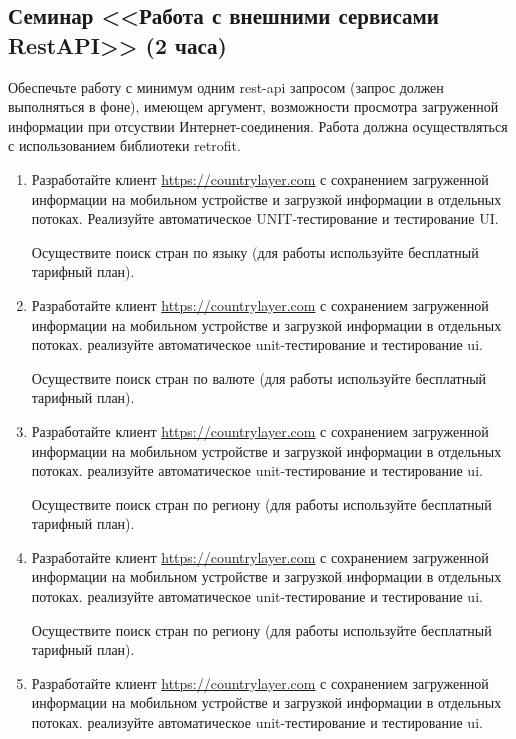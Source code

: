 \subsection{Семинар <<Работа с внешними сервисами RestAPI>> (2 часа)}

Обеспечьте работу с минимум одним rest-api запросом (запрос должен выполняться в фоне), имеющем аргумент, 
возможности просмотра загруженной информации при отсуствии Интернет-соединения. Работа должна осуществляться
с использованием библиотеки retrofit. 

\begin{enumerate}
	\item Разработайте клиент \url{https://countrylayer.com} с сохранением загруженной информации на мобильном устройстве и загрузкой
		информации в отдельных потоках. Реализуйте автоматическое UNIT-тестирование и тестирование UI.

		Осуществите поиск стран по языку (для работы используйте бесплатный тарифный план).

	\item Разработайте клиент \url{https://countrylayer.com} с сохранением загруженной информации на мобильном устройстве и загрузкой
		информации в отдельных потоках. реализуйте автоматическое unit-тестирование и тестирование ui.

		Осуществите поиск стран по валюте (для работы используйте бесплатный тарифный план).

	\item Разработайте клиент \url{https://countrylayer.com} с сохранением загруженной информации на мобильном устройстве и загрузкой
		информации в отдельных потоках. реализуйте автоматическое unit-тестирование и тестирование ui.

		Осуществите поиск стран по региону (для работы используйте бесплатный тарифный план).

	\item Разработайте клиент \url{https://countrylayer.com} с сохранением загруженной информации на мобильном устройстве и загрузкой
		информации в отдельных потоках. реализуйте автоматическое unit-тестирование и тестирование ui.

		Осуществите поиск стран по региону (для работы используйте бесплатный тарифный план).

	\item Разработайте клиент \url{https://countrylayer.com} с сохранением загруженной информации на мобильном устройстве и загрузкой
		информации в отдельных потоках. реализуйте автоматическое unit-тестирование и тестирование ui.


\end{enumerate}
